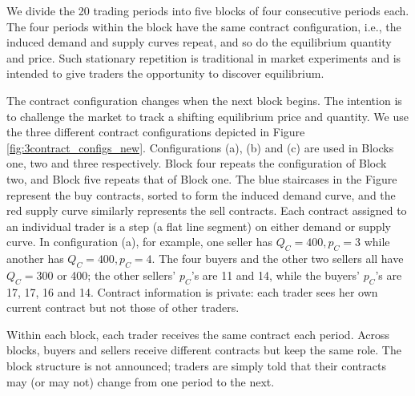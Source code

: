\documentclass[12pt]{article}
\begin{document}
We divide the 20 trading periods into five blocks of four consecutive periods each. 
The four periods within the block have the same contract configuration, i.e., the induced demand and supply curves repeat, and so do the equilibrium quantity and price. 
Such stationary repetition is traditional in market experiments and is intended to give traders the opportunity to discover equilibrium.

The contract configuration changes when the next block begins. 
The intention is to challenge the market to track a shifting equilibrium price and quantity.
We use the three different contract configurations depicted in Figure \ref{fig:3contract_configs_new}.
Configurations (a), (b) and (c) are used in Blocks one, two and three respectively.
Block four repeats the configuration of Block two, and Block five repeats that of Block one. 
The blue staircases in the Figure represent the buy contracts, sorted to form the induced demand curve, and the red supply curve similarly represents the sell contracts. 
Each contract assigned to an individual trader is a step (a flat line segment) on either demand or supply curve. 
In configuration (a), 
for example, one seller has $Q_{C}=400, p_{C}=3$ while another has $Q_{C}=400, p_{C}=4.$ 
The four buyers and the other two sellers all have 
$Q_{C}=300$ or 400; the other sellers' $p_C$'s are 11 and 14,
while the buyers' $p_C$'s are 17, 17, 16 and 14.
Contract information is private: each trader sees her own current contract but not those of other traders.

Within each block, each trader receives the same contract each period. Across blocks, buyers and sellers receive different contracts but keep the same role. The block structure is not announced; traders are simply told that their contracts may (or may not) change from one period to the next. 


\end{document}
